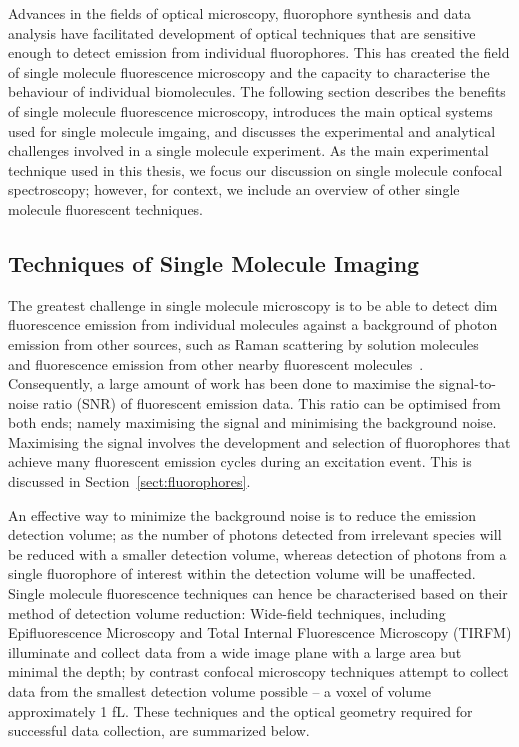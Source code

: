 Advances in the fields of optical microscopy, fluorophore synthesis and data analysis have facilitated development of optical techniques that are sensitive enough to detect emission from individual fluorophores. This has created the field of single molecule fluorescence microscopy and the capacity to characterise the behaviour of individual biomolecules. The following section describes the benefits of single molecule fluorescence microscopy, introduces the main optical systems used for single molecule imgaing, and discusses the experimental and analytical challenges involved in a single molecule experiment. As the main experimental technique used in this thesis, we focus our discussion on single molecule confocal spectroscopy; however, for context, we include an overview of other single molecule fluorescent techniques.  

\subsection{Techniques of Single Molecule Imaging}
The greatest challenge in single molecule microscopy is to be able to detect dim fluorescence emission from individual molecules against a background of photon emission from other sources, such as Raman scattering by solution molecules~\cite{???} and fluorescence emission from other nearby fluorescent molecules~\cite{???}. Consequently, a large amount of work has been done to maximise the signal-to-noise ratio (SNR) of fluorescent emission data. This ratio can be optimised from both ends; namely maximising the signal and minimising the background noise. Maximising the signal involves the development and selection of fluorophores that achieve many fluorescent emission cycles during an excitation event. This is discussed in Section~\ref{sect:fluorophores}. 

An effective way to minimize the background noise is to reduce the emission detection volume; as the number of photons detected from irrelevant species will be reduced with a smaller detection volume, whereas detection of photons from a single fluorophore of interest within the detection volume will be unaffected. Single molecule fluorescence techniques can hence be characterised based on their method of detection volume reduction: Wide-field techniques, including Epifluorescence Microscopy and Total Internal Fluorescence Microscopy (TIRFM) illuminate and collect data from a wide image plane with a large area but minimal the depth; by contrast confocal microscopy techniques attempt to collect data from the smallest detection volume possible -- a voxel of volume approximately 1 fL. These techniques and the optical geometry required for successful data collection, are summarized below. 

